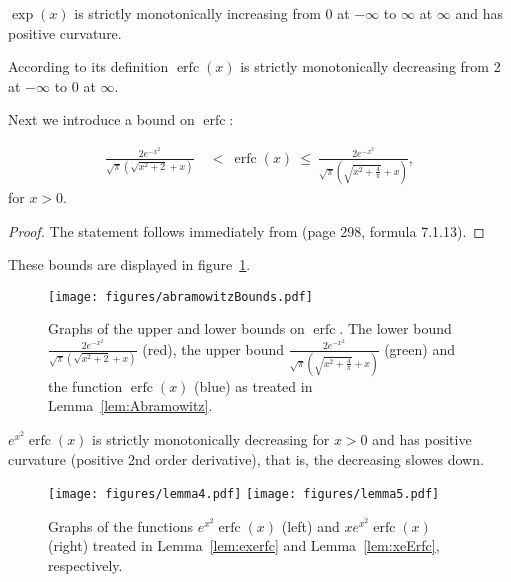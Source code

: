 \documentclass{article}
\renewcommand{\leq}{\leqslant}
\DeclareMathOperator{\erfc}{erfc}
\begin{document}
\begin{lemma}
\label{lem:basics}

$\exp(x)$ is strictly monotonically increasing from $0$ at $-\infty$ to
$\infty$ at $\infty$ and has positive curvature.

According to its definition $\erfc (x)$ is strictly monotonically decreasing from 2 at $-\infty$ to 0 at $\infty$.
\end{lemma}

Next we introduce a bound on $\erfc $:
\begin{lemma}
\label{lem:Abramowitz}

\begin{align}
\frac{2 e^{-x^2}}{\sqrt{\pi } \left(\sqrt{x^2+2}+x\right)} \ &< \
\erfc (x) \ \leq \ 
\frac{2 e^{-x^2}}{\sqrt{\pi } \left(\sqrt{x^2+\frac{4}{\pi }}+x\right)},
\end{align}
for $x>0$. 
\end{lemma}
\begin{proof}
The statement follows immediately from 
\citep{Abramowitz:64} (page 298, formula 7.1.13).
\end{proof}

These bounds are displayed in figure~\ref{fig:abramowitz}.    
\begin{figure}
 \centering
 \texttt{[image: figures/abramowitzBounds.pdf]}
 \caption[Graph of the Abramowitz bound for the complementary error function.]{Graphs of the upper and lower bounds on $\erfc$.  The lower bound $\frac{2 e^{-x^2}}{\sqrt{\pi } \left(\sqrt{x^2+2}+x\right)}$ (red),  
  the upper bound $\frac{2 e^{-x^2}}{\sqrt{\pi } \left(\sqrt{x^2+\frac{4}{\pi }}+x\right)}$ (green) and the function $\erfc (x)$ (blue) as 
  treated in Lemma~\ref{lem:Abramowitz}. \label{fig:abramowitz}}
\end{figure} 


\begin{lemma}[Function $e^{x^2} \erfc (x)$]
\label{lem:exerfc}

$e^{x^2} \erfc (x)$ is strictly monotonically decreasing for $x > 0$ 
and has positive curvature 
(positive 2nd order derivative), that is, the decreasing slowes down.
\end{lemma}

\begin{figure}
 \texttt{[image: figures/lemma4.pdf]}
 \texttt{[image: figures/lemma5.pdf]}
 \caption[Graphs of the functions  $e^{x^2} \erfc (x)$ and $x e^{x^2} \erfc (x)$.]{Graphs of the functions  $e^{x^2} \erfc (x)$ (left) and $x e^{x^2} \erfc (x)$ (right) treated in Lemma~\ref{lem:exerfc} and Lemma~\ref{lem:xeErfc}, 
 respectively. \label{fig:lemma4}}
\end{figure} 
\end{document}

